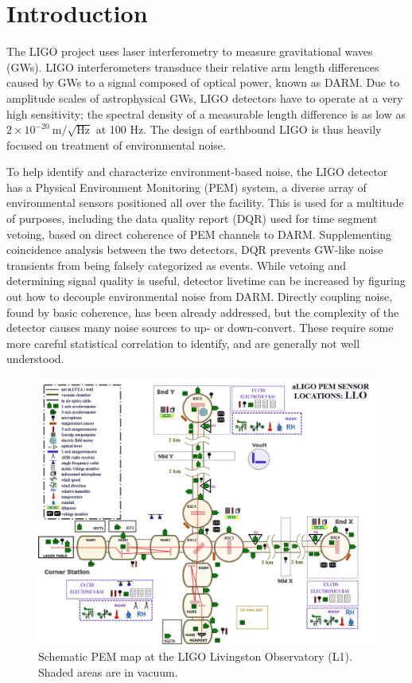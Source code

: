 \section{Introduction}
The LIGO project uses laser interferometry to measure gravitational waves (GWs).
LIGO interferometers transduce their relative arm length differences caused by GWs to a signal composed of optical power, known as DARM.
Due to amplitude scales of astrophysical GWs, LIGO detectors have to operate at a very high sensitivity; the spectral density of a measurable length difference is as low as $2\times 10^{-20}~\mathrm{m}/\sqrt{\mathrm{Hz}}$ at 100 Hz.
The design of earthbound LIGO is thus heavily focused on treatment of environmental noise.

To help identify and characterize environment-based noise, the LIGO detector has a Physical Environment Monitoring (PEM) system, a diverse array of environmental sensors positioned all over the facility.
This is used for a multitude of purposes, including the data quality report (DQR) used for time segment vetoing, based on direct coherence of PEM channels to DARM.
Supplementing coincidence analysis between the two detectors, DQR prevents GW-like noise transients from being falsely categorized as events.
While vetoing and determining signal quality is useful, detector livetime can be increased by figuring out how to decouple environmental noise from DARM.
Directly coupling noise, found by basic coherence, has been already addressed, but the complexity of the detector causes many noise sources to up- or down-convert.
These require some more careful statistical correlation to identify, and are generally not well understood.
\begin{figure}
\includegraphics[width=\textwidth]{assets/llopem.png}
\caption{Schematic PEM map at the LIGO Livingston Observatory (L1). Shaded areas are in vacuum.}
\end{figure}
